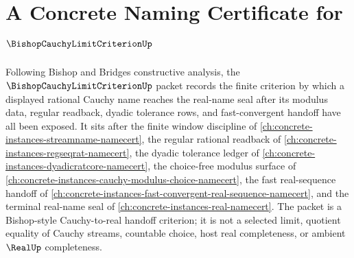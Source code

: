 \chapter{A Concrete Naming Certificate for $\BishopCauchyLimitCriterionUp$}
\label{ch:concrete-instances-bishop-cauchy-limit-criterion-namecert}

Following Bishop and Bridges constructive analysis, the $\BishopCauchyLimitCriterionUp$ packet records the finite criterion by which a displayed rational Cauchy name reaches the real-name seal after its modulus data, regular readback, dyadic tolerance rows, and fast-convergent handoff have all been exposed. It sits after the finite window discipline of \autoref{ch:concrete-instances-streamname-namecert}, the regular rational readback of \autoref{ch:concrete-instances-regseqrat-namecert}, the dyadic tolerance ledger of \autoref{ch:concrete-instances-dyadicratcore-namecert}, the choice-free modulus surface of \autoref{ch:concrete-instances-cauchy-modulus-choice-namecert}, the fast real-sequence handoff of \autoref{ch:concrete-instances-fast-convergent-real-sequence-namecert}, and the terminal real-name seal of \autoref{ch:concrete-instances-real-namecert}. The packet is a Bishop-style Cauchy-to-real handoff criterion; it is not a selected limit, quotient equality of Cauchy streams, countable choice, host real completeness, or ambient $\RealUp$ completeness.

